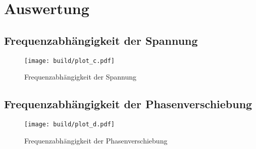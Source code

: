 \section{Auswertung}
\label{sec:Auswertung}

\subsection{Frequenzabhängigkeit der Spannung}
\label{sec:Frequenzabhängigkeit der Spannung}

\begin{figure} [H]
  \centering
  \texttt{[image: build/plot\_c.pdf]}
  \caption{Frequenzabhängigkeit der Spannung}
  \label{fig:plot_c}
\end{figure}

\subsection{Frequenzabhängigkeit der Phasenverschiebung}
\label{sec:Frequenzabhängigkeit der Phasenverschiebung}

\begin{figure} [H]
  \centering
  \texttt{[image: build/plot\_d.pdf]}
  \caption{Frequenzabhängigkeit der Phasenverschiebung}
  \label{fig:plot_d}
\end{figure}